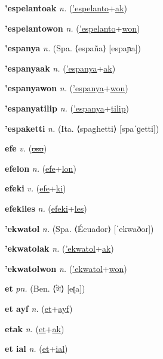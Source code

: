 \textbf{\hypertarget{'espelantoak}{'espelantoak}} \textit{n.} (\hyperlink{'espelanto}{'espelanto}+\allowbreak \hyperlink{ak}{ak})


\textbf{\hypertarget{'espelantowon}{'espelantowon}} \textit{n.} (\hyperlink{'espelanto}{'espelanto}+\allowbreak \hyperlink{won}{won})


\textbf{\hypertarget{'espanya}{'espanya}} \textit{n.} (Spa. ⟨españa⟩ [espaɲa])


\textbf{\hypertarget{'espanyaak}{'espanyaak}} \textit{n.} (\hyperlink{'espanya}{'espanya}+\allowbreak \hyperlink{ak}{ak})


\textbf{\hypertarget{'espanyawon}{'espanyawon}} \textit{n.} (\hyperlink{'espanya}{'espanya}+\allowbreak \hyperlink{won}{won})


\textbf{\hypertarget{'espanyatilip}{'espanyatilip}} \textit{n.} (\hyperlink{'espanya}{'espanya}+\allowbreak \hyperlink{tilip}{tilip})


\textbf{\hypertarget{'espaketti}{'espaketti}} \textit{n.} (Ita. ⟨spaghetti⟩ [spaˈɡetti])


\textbf{\hypertarget{efe}{efe}} \textit{v.} (\hyperlink{oso}{\sout{oso}})


\textbf{\hypertarget{efelon}{efelon}} \textit{n.} (\hyperlink{efe}{efe}+\allowbreak \hyperlink{lon}{lon})


\textbf{\hypertarget{efeki}{efeki}} \textit{v.} (\hyperlink{efe}{efe}+\allowbreak \hyperlink{ki}{ki})


\textbf{\hypertarget{efekiles}{efekiles}} \textit{n.} (\hyperlink{efeki}{efeki}+\allowbreak \hyperlink{les}{les})


\textbf{\hypertarget{'ekwatol}{'ekwatol}} \textit{n.} (Spa. ⟨Écuador⟩ [ˈekwaðoɾ])


\textbf{\hypertarget{'ekwatolak}{'ekwatolak}} \textit{n.} (\hyperlink{'ekwatol}{'ekwatol}+\allowbreak \hyperlink{ak}{ak})


\textbf{\hypertarget{'ekwatolwon}{'ekwatolwon}} \textit{n.} (\hyperlink{'ekwatol}{'ekwatol}+\allowbreak \hyperlink{won}{won})


\textbf{\hypertarget{et}{et}} \textit{pn.} (Ben. ⟨{\bengali{}টা}⟩ [eʈa])


\textbf{\hypertarget{et ayf}{et ayf}} \textit{n.} (\hyperlink{et}{et}+\allowbreak \hyperlink{ayf}{ayf})


\textbf{\hypertarget{etak}{etak}} \textit{n.} (\hyperlink{et}{et}+\allowbreak \hyperlink{ak}{ak})


\textbf{\hypertarget{et ial}{et ial}} \textit{n.} (\hyperlink{et}{et}+\allowbreak \hyperlink{ial}{ial})


